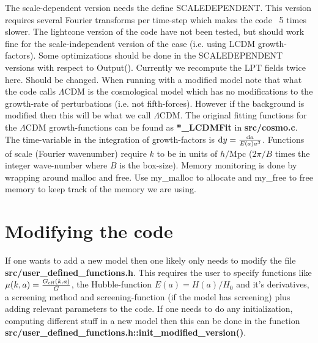 \documentclass[usenatbib]{article}
\begin{document}
The scale-dependent version needs the define SCALEDEPENDENT. This version requires several Fourier transforms per time-step which makes the code ~5 times slower.
\newline
\newline
The lightcone version of the code have not been tested, but should work fine for the scale-independent version of the case (i.e. using LCDM growth-factors).
\newline
\newline
Some optimizations should be done in the SCALEDEPENDENT versions with respect to Output(). Currently we recompute the LPT fields twice here. Should be changed.
\newline
\newline
When running with a modified model note that what the code calls $\Lambda$CDM is the cosmological model which has no modifications to the growth-rate of perturbations (i.e. not fifth-forces). However if the background is modified then this will be what we call $\Lambda$CDM.
\newline
\newline
The original fitting functions for the $\Lambda$CDM growth-functions can be found as \textbf{*\_LCDMFit} in \textbf{src/cosmo.c}.
\newline
\newline
The time-variable in the integration of growth-factors is ${\rm d}y = \frac{{\rm d}a}{E(a)a^3}$.
\newline
\newline
Functions of scale (Fourier wavenumber) require $k$ to be in units of $h/$Mpc ($2\pi/B$ times the integer wave-number where $B$ is the box-size).
\newline
\newline
Memory monitoring is done by wrapping around malloc and free. Use my\_malloc to allocate and my\_free to free memory to keep track of the memory we are using.

\section*{Modifying the code}

If one wants to add a new model then one likely only needs to modify the file \textbf{src/user\_defined\_functions.h}. This requires the user to specify functions like $\mu(k,a) = \frac{G_{\rm eff}(k,a)}{G}$, the Hubble-function $E(a) = H(a)/H_0$ and it's derivatives, a screening method and screening-function (if the model has screening) plus adding relevant parameters to the code.
\newline
\newline
If one needs to do any initialization, computing different stuff in a new model then this can be done in the function \textbf{src/user\_defined\_functions.h::init\_modified\_version()}.
\end{document}
